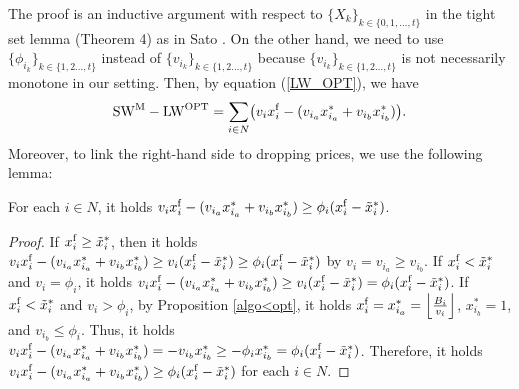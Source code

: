 \documentclass[letterpaper,11pt]{article}
\begin{document}
	
	The proof is an inductive argument with respect to $\{X_k\}_{k\in \{0,1,\ldots,t\}}$ 
	in the tight set lemma (Theorem 4) as in Sato \cite{S2023}.
	On the other hand, we need to use $\{\phi_{i_k}\}_{k\in \{1,2\ldots,t\}}$ instead of 
	$\{v_{i_k}\}_{k\in \{1,2\ldots,t\}}$ because 
	$\{v_{i_k}\}_{k\in \{1,2\ldots,t\}}$ is not necessarily monotone in our setting.
	Then, by equation (\ref{LW_OPT}), we have 
	\[
	{\rm SW}^{\rm M}- {\rm LW}^{\rm OPT}
	=\sum_{i\in N}\bigl(v_i x^{\rm f}_i-(v_{i_{a}} x^*_{i_{a}}+v_{i_{b}} x^*_{i_{b}})\bigr).
	\]
	Moreover, to link the right-hand side to dropping prices, we use the following lemma: 
	\begin{lemma}
	\label{prepare_SW}
	For each $i\in N$, it holds 
	$v_i x^{\rm f}_i-(v_{i_{a}} x^*_{i_{a}}+v_{i_{b}} x^*_{i_{b}})\geq \phi_i(x^{\rm f}_i-\tilde{x}^*_{i})$.
	\end{lemma}
	\begin{proof}
	If $x^{\rm f}_i\geq \tilde{x}^*_i$, then it holds 
	$v_i x^{\rm f}_i-(v_{i_{a}} x^*_{i_{a}}+v_{i_{b}} x^*_{i_{b}})\geq v_i (x^{\rm f}_i-\tilde{x}^*_{i})\geq \phi_i(x^{\rm f}_i-\tilde{x}^*_{i})$ by $v_i=v_{i_{a}}\geq v_{i_{b}}$.
	If $x^{\rm f}_i< \tilde{x}^*_i$ and $v_i=\phi_i$, it holds 
	$v_i x^{\rm f}_i-(v_{i_{a}} x^*_{i_{a}}+v_{i_{b}} x^*_{i_{b}})\geq v_i(x^{\rm f}_i-\tilde{x}^*_i)= \phi_i(x^{\rm f}_i-\tilde{x}^*_i)$.
	If $x^{\rm f}_i< \tilde{x}^*_i$ and $v_i>\phi_i$, by Proposition \ref{algo<opt}, 
	it holds $x^{\rm f}_i=x^*_{i_{a}}=\left\lfloor \frac{B_i}{v_i}\right\rfloor$,
	$x^*_{i_{b}}=1$, and $v_{i_{b}}\leq \phi_i$.
	Thus,  
	it holds $v_i x^{\rm f}_i-(v_{i_{a}} x^*_{i_{a}}+v_{i_{b}} x^*_{i_{b}})=-v_{i_{b}}x^*_{i_{b}}\geq -\phi_{i}x^*_{i_{b}}
	=\phi_i(x^{\rm f}_i-\tilde{x}^*_i)$.
	Therefore, it holds $v_i x^{\rm f}_i-(v_{i_{a}} x^*_{i_{a}}+v_{i_{b}} x^*_{i_{b}})\geq \phi_i(x^{\rm f}_i-\tilde{x}^*_i)$ for each $i\in N$.
\end{proof}	
\end{document}

